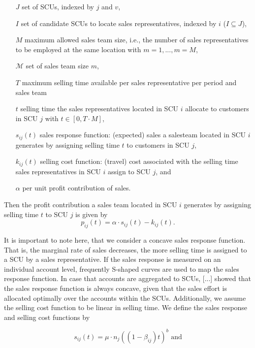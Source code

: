 \documentclass[12pt]{scrartcl}
\begin{document}
\begin{itemize}
\setlength{\labelsep}{1em}
    \item[$J$] set of SCUs, indexed by $j$ and $v$,
    \item[$I$] set of candidate SCUs to locate sales representatives, indexed by $i$ ($I \subseteq J$),
    \item[$M$] maximum allowed sales team size, i.e., the number of sales representatives to be employed at the same location with $m=1,...,m=M$,
    \item[$\mathcal{M}$] set of sales team size $m$,
    \item[$T$] maximum selling time available per sales representative per period and sales team
    \item[$t$] selling time the sales representatives located in SCU $i$ allocate to customers in SCU $j$ with $t \in \left[0,T \cdot M\right]$,
    \item[$s_{ij}(t)$] sales response function: (expected) sales a salesteam located in SCU $i$ generates by assigning selling time $t$ to customers in SCU $j$,
    \item[$k_{ij}(t)$] selling cost function: (travel) cost associated with the selling time sales representatives in SCU $i$ assign to SCU $j$, and
    \item[$\alpha$] per unit profit contribution of sales.
\end{itemize}

Then the profit contribution a sales team located in SCU $i$ generates by assigning selling time $t$ to SCU $j$ is given by
\begin{equation}
    p_{ij}(t) = \alpha \cdot s_{ij}(t) - k_{ij}(t).
\end{equation}

It is important to note here, that we consider a concave sales response function. That is, the marginal rate of sales decreases, the more selling time is assigned to a SCU by a sales representative. If the sales response is measured on an individual account level, frequently S-shaped curves are used to map the sales response function. In case that accounts are aggregated to SCUs, [...] showed that the sales response function is always concave, given that the sales effort is allocated optimally over the accounts within the SCUs. Additionally, we assume the selling cost function to be linear in selling time. We define the sales response and selling cost functions by 

\begin{equation}
    s_{ij}(t) = \mu \cdot n_j ((1 - \beta_{ij})t)^b \text{ and}
\end{equation}
\end{document}
